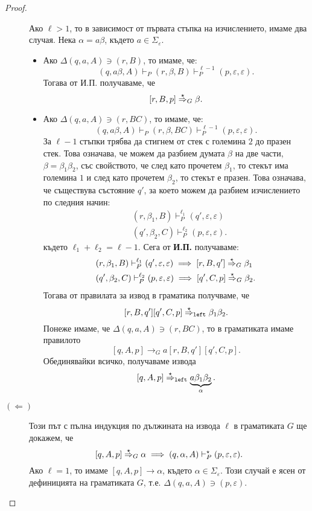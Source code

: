 \begin{proof}
\begin{description}
    Ако $\ell > 1$, то в зависимост от първата стъпка на изчислението, имаме два случая.
    Нека $\alpha = a\beta$, където $a \in \Sigma_\varepsilon$.
    \begin{itemize}
    \item 
      Ако $\Delta(q,a,A) \ni (r,B)$, то имаме, че:
      \[(q,a\beta,A) \vdash_P (r,\beta,B) \vdash^{\ell-1}_P (p, \varepsilon, \varepsilon).\]
      Тогава от И.П. получаваме, че
      \[[r,B,p] \stackrel{{\star}}{\Rightarrow}_G \beta.\]
    \item
      Ако $\Delta(q, a, A) \ni (r, BC)$, то имаме, че:
      \[(q, a\beta, A) \vdash_P (r, \beta, BC) \vdash^{\ell-1}_P (p, \varepsilon, \varepsilon).\]      
      За $\ell-1$ стъпки трябва да стигнем от стек с големина $2$ до празен стек.
      Това означава, че можем да разбием думата $\beta$ на две части, $\beta = \beta_1\beta_2$, със свойството, че след като прочетем $\beta_1$,
      то стекът има големина $1$ и след като прочетем $\beta_2$, то стекът е празен.
      Това означава, че съществува състояние $q'$, за което можем да разбием изчислението по следния начин:
      \begin{align*}
        & (r, \beta_1, B) \vdash^{\ell_1}_P (q',\varepsilon,\varepsilon)\\
        & (q', \beta_2, C) \vdash^{\ell_2}_P (p,\varepsilon,\varepsilon).
      \end{align*}
      където $\ell_1 + \ell_2 = \ell - 1$.    
      Сега от {\bf И.П.} получаваме:
      \begin{align*}
        & (r, \beta_1, B) \vdash^{\ell_1}_P (q', \varepsilon, \varepsilon) \implies [r, B, q'] \stackrel{{\star}}{\Rightarrow}_G \beta_1\\
        & (q', \beta_2, C) \vdash^{\ell_2}_P (p, \varepsilon, \varepsilon) \implies [q', C, p] \stackrel{{\star}}{\Rightarrow}_G \beta_2.
      \end{align*}
      Тогава от правилата за извод в граматика получваме, че
      \[[r,B,q'][q',C,p] \stackrel{{\star}}{\Rightarrow}_{\texttt{left}} \beta_1\beta_2.\]
      Понеже имаме, че $\Delta(q,a,A) \ni (r,BC)$, то в граматиката имаме правилото
      \[[q,A,p] \to_G a[r,B,q'][q',C,p].\]
      Обединявайки всичко, получаваме извода
      \[[q,A,p] \stackrel{{\star}}{\Rightarrow}_{\texttt{left}} \underbrace{a\beta_1\beta_2}_{\alpha}.\]
    \end{itemize}
  \item[$(\Leftarrow)$]
    Този път с пълна индукция по дължината на извода $\ell$ в граматиката $G$ ще докажем, че
    \[[q,A,p] \stackrel{{\star}}{\Rightarrow}_G \alpha \implies (q,\alpha,A) \vdash^\star_P (p,\varepsilon,\varepsilon).\]
    Ако $\ell = 1$, то имаме $[q,A,p] \rightarrow \alpha$, където $\alpha \in \Sigma_\varepsilon$.
    Този случай е ясен от дефиницията на граматиката $G$, т.е. $\Delta(q,a,A) \ni (p,\varepsilon)$.


\end{description}
\end{proof}
